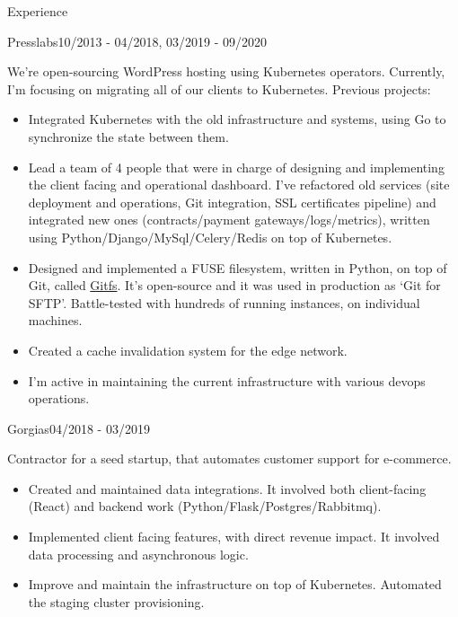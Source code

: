\documentclass{resume}
\begin{document}
\begin{rSection}{Experience}
    \begin{rSubsection}{Presslabs}{10/2013 - 04/2018, 03/2019 - 09/2020}{}{}
        \item We’re open-sourcing WordPress hosting using Kubernetes operators. Currently, I'm focusing on migrating all of our clients to Kubernetes. Previous projects:
        \begin{itemize}
            \setlength\itemsep{-0.3em}
            \item Integrated Kubernetes with the old infrastructure and systems, using Go to synchronize the state between them.
            \item Lead a team of 4 people that were in charge of designing and implementing the client facing and operational dashboard. I’ve refactored old services (site deployment and operations, Git integration, SSL certificates pipeline) and integrated new ones (contracts/payment gateways/logs/metrics), written using Python/Django/MySql/Celery/Redis on top of Kubernetes.
            \item Designed and implemented a FUSE filesystem, written in Python, on top of Git, called \href{https://github.com/presslabs/gitfs.git}{Gitfs}. It’s open-source and it was used in production as ‘Git for SFTP’. Battle-tested with hundreds of running instances, on individual machines.
            \item Created a cache invalidation system for the edge network.
            \item I’m active in maintaining the current infrastructure with various devops operations.
        \end{itemize}
    \end{rSubsection}

    \begin{rSubsection}{Gorgias}{04/2018 - 03/2019}{}{}
        \item Contractor for a seed startup, that automates customer support for e-commerce.
        \begin{itemize}
            \setlength\itemsep{-0.3em}
            \item Created and maintained data integrations. It involved both client-facing (React) and backend work (Python/Flask/Postgres/Rabbitmq).
            \item Implemented client facing features, with direct revenue impact. It involved data processing and asynchronous logic.
            \item Improve and maintain the infrastructure on top of Kubernetes. Automated the staging cluster provisioning.
        \end{itemize}
    \end{rSubsection}


\end{rSection}
\end{document}
